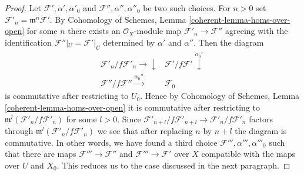 \begin{proof}
Let $\mathcal{F}', \alpha', \alpha'_0$ and
$\mathcal{F}'', \alpha'', \alpha''_0$ be two such choices.
For $n > 0$ set $\mathcal{F}'_n = \mathfrak m^n \mathcal{F}'$.
By Cohomology of Schemes, Lemma \ref{coherent-lemma-homs-over-open}
for some $n$
there exists an $\mathcal{O}_X$-module map $\mathcal{F}'_n \to \mathcal{F}''$
agreeing with the identification
$\mathcal{F}''|_U = \mathcal{F}'|_U$ determined by $\alpha'$ and $\alpha''$.
Then the diagram
$$
\begin{array}{cc}\mathcal{F}'_n/f\mathcal{F}'_n \longrightarrow\downarrow & \mathcal{F}'/f\mathcal{F}' \overset{\alpha_0'}{\downarrow} \\ \mathcal{F}''/f\mathcal{F}'' \overset{\alpha_0''}{\longrightarrow} & \mathcal{F}_0\end{array}
$$
is commutative after restricting to $U_0$. Hence by
Cohomology of Schemes, Lemma \ref{coherent-lemma-homs-over-open}
it is commutative after restricting to
$\mathfrak m^l(\mathcal{F}'_n/f\mathcal{F}'_n)$ for some $l > 0$. Since
$\mathcal{F}'_{n + l}/f\mathcal{F}'_{n + l} \to \mathcal{F}'_n/f\mathcal{F}'_n$
factors through $\mathfrak m^l(\mathcal{F}'_n/f\mathcal{F}'_n)$
we see that after replacing $n$ by $n + l$ the diagram
is commutative. In other words, we have found a third choice
$\mathcal{F}''', \alpha''', \alpha'''_0$
such that there are maps $\mathcal{F}''' \to \mathcal{F}''$
and $\mathcal{F}''' \to \mathcal{F}'$ over $X$
compatible with the maps over $U$ and $X_0$. This reduces us to
the case discussed in the next paragraph.


\end{proof}
